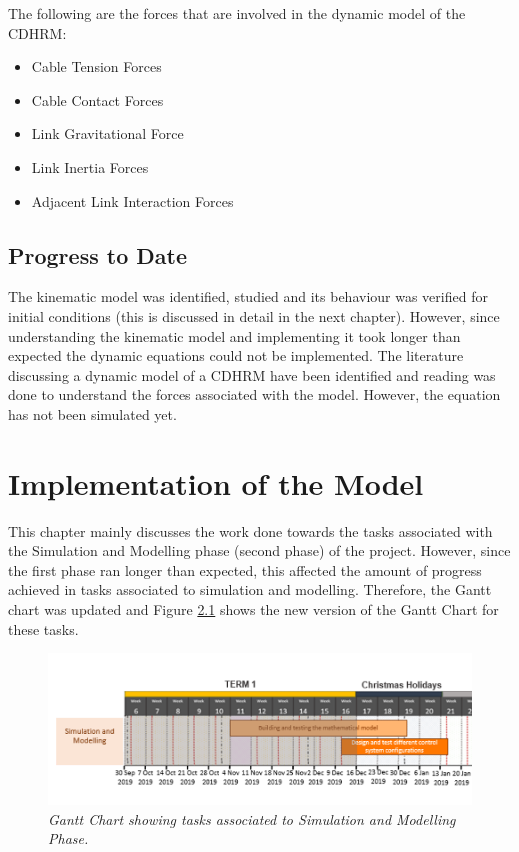 \documentclass[a4paper,12pt]{report}
\begin{document}
The following are the forces that are involved in the dynamic model of the CDHRM:
\begin{itemize}
	\item Cable Tension Forces
	\item Cable Contact Forces
	\item Link Gravitational Force
	\item Link Inertia Forces
	\item Adjacent Link Interaction Forces
\end{itemize}


\section{Progress to Date}
The kinematic model was identified, studied and its behaviour was verified for initial conditions (this is discussed in detail in the next chapter). However, since understanding the kinematic model and implementing it took longer than expected the dynamic equations could not be implemented. The literature discussing a dynamic model of a CDHRM have been identified and reading was done to understand the forces associated with the model. However, the equation has not been simulated yet.

\chapter{Implementation of the Model}
This chapter mainly discusses the work done towards the tasks associated with the Simulation and Modelling phase (second phase) of the project. However, since the first phase ran longer than expected, this affected the amount of progress achieved in tasks associated to simulation and modelling. Therefore, the Gantt chart was updated and Figure \ref{gc-2} shows the new version of the Gantt Chart for these tasks. 
\begin{figure}[h]
	\centering
	\includegraphics[width=\textwidth]{images/GC-chap3.png}
	\caption{\textit{Gantt Chart showing tasks associated to Simulation and Modelling Phase.}}
	\label{gc-2}
\end{figure}
\end{document}
